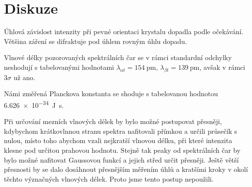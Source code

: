 \section*{Diskuze}
Úhlová závislost intenzity při pevné orientaci krystalu dopadla podle očekávání. Většina záření se difraktuje pod úhlem rovným úhlu dopadu.


Vlnové délky pozorovaných spektrálních čar se v rámci standardní odchylky neshodují s tabelovanými hodnotami $\lambda_{\alpha t} = \SI{154}{\pico\metre}$, $\lambda_{\beta t} = \SI{139}{\pico\metre}$, avšak v rámci $3\sigma$ už ano.

Námi změřená Planckova konstanta se shoduje s tabelovanou hodnotou \SI{6.626e-34}{\joule\s}.

Při určování mezních vlnových délek by bylo možné postupovat přesněji, kdybychom krátkovlnnou stranu spektra nafitovali přímkou a určili průsečík s nulou, místo toho abychom vzali nejkratší vlnovou délku, při které intenzita klesne pod určitou prahovou hodnotu. Stejně tak peaky od spektrálních čar by bylo možné nafitovat Gaussovou funkcí a jejich střed určit přesněji. Ještě větší přesnosti by se dalo dosáhnout přesnějším měřením úhlů a kratšími kroky v okolí těchto význačných vlnových délek. Proto jsme tento postup nepoužili.